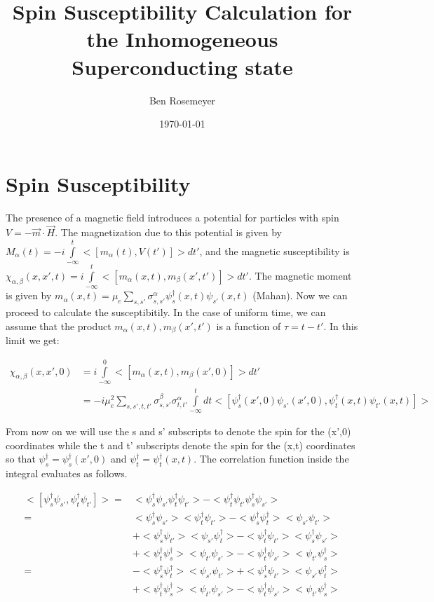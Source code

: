\documentclass{article}
\begin{document}
\title{Spin Susceptibility Calculation for the Inhomogeneous Superconducting state}
\author{Ben Rosemeyer}
\date{\today}
\maketitle


\section*{Spin Susceptibility}
The presence of a magnetic field introduces a potential for particles with spin $V=-\vec{m}\cdot\vec{H}$. The magnetization due to this potential is given by $M_\alpha(t)=-i\int\limits_{-\infty}^t <[m_\alpha(t),V(t')]>dt'$, and the magnetic susceptibility is $\chi_{\alpha,\beta}(x,x',t)=i\int\limits_{-\infty}^t<[m_\alpha(x,t),m_\beta(x',t')]>dt'$. The magnetic moment is given by $m_\alpha(x,t)=\mu_e\sum\limits_{s,s'} \sigma^{\alpha}_{s,s'}\psi^\dagger_s(x,t) \psi_{s'}(x,t)$ (Mahan). Now we can proceed to calculate the susceptibitily. In the case of uniform time, we can assume that the product $m_\alpha(x,t),m_\beta(x',t')$ is a function of $\tau=t-t'$. In this limit we get:

\begin{align*}
\chi_{\alpha,\beta}(x,x',0)&=i\int\limits_{-\infty}^0<[m_\alpha(x,t),m_\beta(x',0)]>dt' \\ 
&=-i\mu_e^2\sum\limits_{s,s',t,t'}\sigma^{\beta}_{s,s'}\sigma^{\alpha}_{t,t'}\int\limits_{-\infty}^t dt <[\psi^\dagger_{s}(x',0) \psi_{s'}(x',0),\psi^\dagger_{t}(x,t) \psi_{t'}(x,t)]>
\end{align*}

From now on we will use the s and s' subscripts to denote the spin for the (x',0) coordinates while the t and t' subscripts denote the spin for the (x,t) coordinates so that $\psi^\dagger_{s}=\psi^\dagger_{s}(x',0)$ and $\psi^\dagger_{t}=\psi^\dagger_{t}(x,t)$. The correlation function inside the integral evaluates as follows.

\begin{align*}
<[\psi^\dagger_{s} \psi_{s'},\psi^\dagger_{t} \psi_{t'}]>=&<\psi^\dagger_{s} \psi_{s'}\psi^\dagger_{t} \psi_{t'}>-<\psi^\dagger_{t} \psi_{t'}\psi^\dagger_{s} \psi_{s'}> \\
=&<\psi^\dagger_{s}\psi_{s'}><\psi^\dagger_{t}\psi_{t'}>-<\psi^\dagger_{s}\psi^\dagger_{t}><\psi_{s'}\psi_{t'}> \\ 
&+<\psi^\dagger_{s}\psi_{t'}><\psi_{s'}\psi^\dagger_{t}>-<\psi^\dagger_{t}\psi_{t'}><\psi^\dagger_{s}\psi_{s'}> \\ 
&+<\psi^\dagger_{t}\psi^\dagger_{s}><\psi_{t'}\psi_{s'}>-<\psi^\dagger_{t}\psi_{s'}><\psi_{t'}\psi^\dagger_{s}> \\
=&-<\psi^\dagger_{s}\psi^\dagger_{t}><\psi_{s'}\psi_{t'}>+<\psi^\dagger_{s}\psi_{t'}><\psi_{s'}\psi^\dagger_{t}> \\ 
&+<\psi^\dagger_{t}\psi^\dagger_{s}><\psi_{t'}\psi_{s'}>-<\psi^\dagger_{t}\psi_{s'}><\psi_{t'}\psi^\dagger_{s}> \\
\end{align*}
\end{document}
